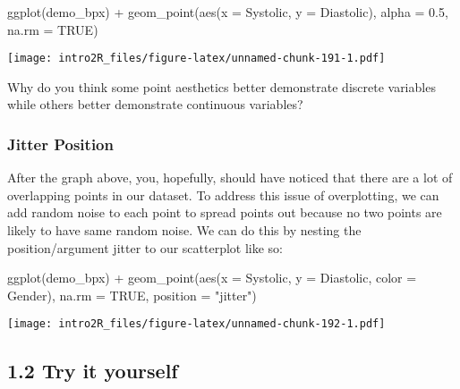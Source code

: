 \documentclass[
]{book}
\newenvironment{Shaded}{\begin{snugshade}}{\end{snugshade}}
\newcommand{\AttributeTok}[1]{\textcolor[rgb]{0.77,0.63,0.00}{#1}}
\newcommand{\ConstantTok}[1]{\textcolor[rgb]{0.00,0.00,0.00}{#1}}
\newcommand{\FloatTok}[1]{\textcolor[rgb]{0.00,0.00,0.81}{#1}}
\newcommand{\FunctionTok}[1]{\textcolor[rgb]{0.00,0.00,0.00}{#1}}
\newcommand{\NormalTok}[1]{#1}
\newcommand{\SpecialCharTok}[1]{\textcolor[rgb]{0.00,0.00,0.00}{#1}}
\newcommand{\StringTok}[1]{\textcolor[rgb]{0.31,0.60,0.02}{#1}}
\begin{document}
\begin{Shaded}
\begin{Highlighting}[]
\FunctionTok{ggplot}\NormalTok{(demo\_bpx) }\SpecialCharTok{+}
  \FunctionTok{geom\_point}\NormalTok{(}\FunctionTok{aes}\NormalTok{(}\AttributeTok{x =}\NormalTok{ Systolic, }\AttributeTok{y =}\NormalTok{ Diastolic),}
             \AttributeTok{alpha =} \FloatTok{0.5}\NormalTok{,}
             \AttributeTok{na.rm =} \ConstantTok{TRUE}\NormalTok{)}
\end{Highlighting}
\end{Shaded}

\texttt{[image: intro2R\_files/figure-latex/unnamed-chunk-191-1.pdf]}

Why do you think some point aesthetics better demonstrate discrete variables while others better demonstrate continuous variables?

\hypertarget{jitter-position}{%
\subsubsection{Jitter Position}\label{jitter-position}}

After the graph above, you, hopefully, should have noticed that there are a lot of overlapping points in our dataset. To address this issue of overplotting, we can add random noise to each point to spread points out because no two points are likely to have same random noise. We can do this by nesting the position/argument jitter to our scatterplot like so:

\begin{Shaded}
\begin{Highlighting}[]
\FunctionTok{ggplot}\NormalTok{(demo\_bpx) }\SpecialCharTok{+}
  \FunctionTok{geom\_point}\NormalTok{(}\FunctionTok{aes}\NormalTok{(}\AttributeTok{x =}\NormalTok{ Systolic, }
                 \AttributeTok{y =}\NormalTok{ Diastolic, }
                 \AttributeTok{color =}\NormalTok{ Gender), }
             \AttributeTok{na.rm =} \ConstantTok{TRUE}\NormalTok{,}
             \AttributeTok{position =} \StringTok{"jitter"}\NormalTok{)}
\end{Highlighting}
\end{Shaded}

\texttt{[image: intro2R\_files/figure-latex/unnamed-chunk-192-1.pdf]}

\hypertarget{try-it-yourself-24}{%
\subsection{1.2 Try it yourself}\label{try-it-yourself-24}}
\end{document}
